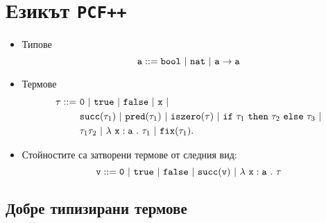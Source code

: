 \section{Езикът \texttt{PCF++}}


\begin{itemize}
\item
  Типове
  \[\vv{a} ::= \bool\ |\ \nat\ |\ \vv{a}\to\vv{a}\]
\item
  Термове
  \begin{align*}
    \tau ::=\ & \vv{0}\ |\ \tru\ |\ \fls\ |\ \vv{x}\ |\\
             & \scc(\tau_1)\ |\ \prd(\tau_1)\ |\ \texttt{iszero}(\tau)\ |\ \ifelse{\tau_1}{\tau_2}{\tau_3}\ |\\
             &\tau_1\tau_2\ |\ \lamb{x}{a}{\tau_1}\ |\ \fix(\tau_1).
  \end{align*}
\item
  Стойностите са затворени термове от следния вид:
  \[\vv{v} ::= \vv{0}\ |\ \tru\ |\ \fls\ |\ \scc(\vv{v})\ |\ \lamb{x}{a}{\tau}\]
\end{itemize}

\subsection{Добре типизирани термове}

